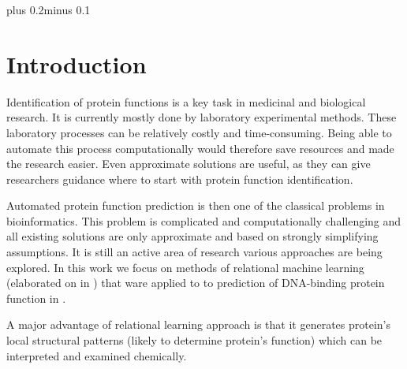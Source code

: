\documentclass[11pt,twoside,a4paper]{book}
\begin{document}
\listoftables



\mainbodystarts
\normalfont
{}\baselineskip plus 0.2\baselineskip minus 0.1\baselineskip



% 
% 

\chapter{Introduction}
Identification of protein functions is a key task in medicinal and biological research.
It is currently mostly done by laboratory experimental methods.
These laboratory processes can be relatively costly and time-consuming. 
Being able to automate this process computationally would therefore save resources
and made the research easier.
Even approximate solutions are useful,
as they can give researchers guidance where
to start with protein function identification.

Automated protein function prediction is then one of the classical problems in bioinformatics. 
This problem is complicated and computationally challenging and all existing solutions
are only approximate and based on strongly simplifying assumptions.
It is still an active area of research various approaches are being explored. 
In this work we focus on methods of relational machine learning (elaborated on in \cite{kuzelka}\cite{relf})
that ware applied to to prediction of DNA-binding protein function in \cite{szabova}.

A major advantage of relational learning approach is that it generates protein's local structural patterns
(likely to determine protein's function) which can be interpreted and examined chemically.
\end{document}

